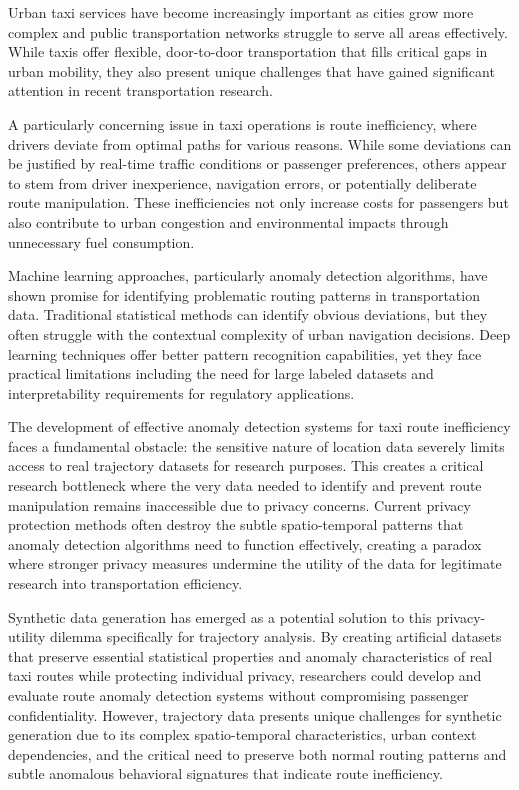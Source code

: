 \documentclass[runningheads]{llncs}
\begin{document}
Urban taxi services have become increasingly important as cities grow more complex and public transportation networks struggle to serve all areas effectively. While taxis offer flexible, door-to-door transportation that fills critical gaps in urban mobility, they also present unique challenges that have gained significant attention in recent transportation research.

A particularly concerning issue in taxi operations is route inefficiency, where drivers deviate from optimal paths for various reasons. While some deviations can be justified by real-time traffic conditions or passenger preferences, others appear to stem from driver inexperience, navigation errors, or potentially deliberate route manipulation. These inefficiencies not only increase costs for passengers but also contribute to urban congestion and environmental impacts through unnecessary fuel consumption.

Machine learning approaches, particularly anomaly detection algorithms, have shown promise for identifying problematic routing patterns in transportation data. Traditional statistical methods can identify obvious deviations, but they often struggle with the contextual complexity of urban navigation decisions. Deep learning techniques offer better pattern recognition capabilities, yet they face practical limitations including the need for large labeled datasets and interpretability requirements for regulatory applications.

The development of effective anomaly detection systems for taxi route inefficiency faces a fundamental obstacle: the sensitive nature of location data severely limits access to real trajectory datasets for research purposes. This creates a critical research bottleneck where the very data needed to identify and prevent route manipulation remains inaccessible due to privacy concerns. Current privacy protection methods often destroy the subtle spatio-temporal patterns that anomaly detection algorithms need to function effectively, creating a paradox where stronger privacy measures undermine the utility of the data for legitimate research into transportation efficiency.

Synthetic data generation has emerged as a potential solution to this privacy-utility dilemma specifically for trajectory analysis. By creating artificial datasets that preserve essential statistical properties and anomaly characteristics of real taxi routes while protecting individual privacy, researchers could develop and evaluate route anomaly detection systems without compromising passenger confidentiality. However, trajectory data presents unique challenges for synthetic generation due to its complex spatio-temporal characteristics, urban context dependencies, and the critical need to preserve both normal routing patterns and subtle anomalous behavioral signatures that indicate route inefficiency.
\end{document}
